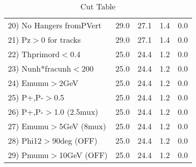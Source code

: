 \begin{table}[h!]
\begin{tabular}{||l||r|r|r|r||}
 20) No Hangers fromPVert &        29.0 &        27.1 &         1.4 &         0.0 \\
 21) Pz$>$0 for tracks    &        29.0 &        27.1 &         1.4 &         0.0 \\
 22) Thprimord$<$0.4      &        25.0 &        24.4 &         1.2 &         0.0 \\
 23) Nunh*fracunh$<$200   &        25.0 &        24.4 &         1.2 &         0.0 \\
 24) Emumu$>$2GeV         &        25.0 &        24.4 &         1.2 &         0.0 \\
 25) P+,P-$>$0.5          &        25.0 &        24.4 &         1.2 &         0.0 \\
 26) P+,P-$>$1.0 (2.5mux) &        25.0 &        24.4 &         1.2 &         0.0 \\
 27) Emumu$>$5GeV  (8mux) &        25.0 &        24.4 &         1.2 &         0.0 \\
 28) Phi12$>$90deg  (OFF) &        25.0 &        24.4 &         1.2 &         0.0 \\
 29) Pmumu$>$10GeV  (OFF) &        25.0 &        24.4 &         1.2 &         0.0 \\
 \hline
 \hline
 \end{tabular}
 \caption{Cut Table \cohrp  }
 \label{tab-cut_crhop}
 \end{table}

